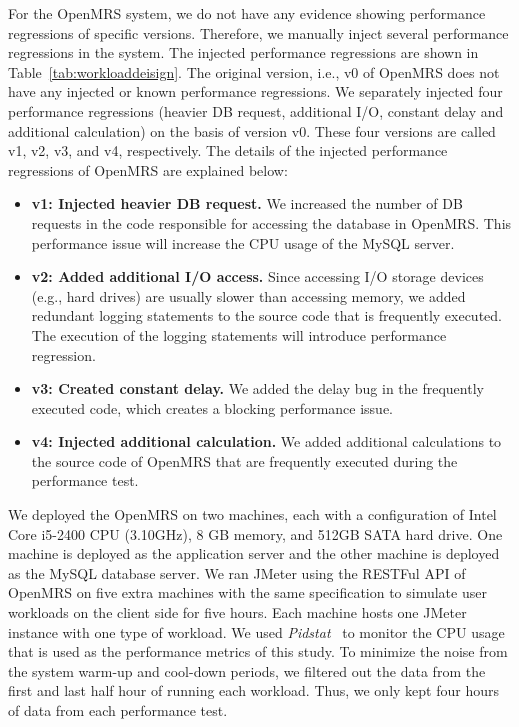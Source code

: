 For the OpenMRS system, we do not have any evidence showing performance regressions of specific versions. Therefore, we manually inject several performance regressions in the system. The injected performance regressions are shown in Table~\ref{tab:workloaddeisign}. 
The original version, i.e., v0 of OpenMRS does not have any injected or known performance regressions. 
We separately injected four performance regressions (heavier DB request, additional I/O, constant delay and additional calculation) on the basis of version v0. These four versions are called v1, v2, v3, and v4, respectively. The details of the injected performance regressions of OpenMRS are explained below:
\begin{itemize}
    \item[$\bullet$] \textbf{v1: Injected heavier DB request.}  We increased the number of DB requests in the code responsible for accessing the database in OpenMRS. This performance issue will increase the CPU usage of the MySQL server.
    \item[$\bullet$] \textbf{v2: Added additional I/O access.} Since accessing I/O storage devices (e.g., hard drives) are usually slower than accessing memory, we added redundant logging statements to the source code that is frequently executed. The execution of the logging statements will introduce performance regression.
    \item[$\bullet$] \textbf{v3: Created constant delay.} We added the delay bug in the frequently executed code, which creates a blocking performance issue.
    \item[$\bullet$] \textbf{v4: Injected additional calculation.} We added additional calculations to the source code of OpenMRS that are frequently executed during the performance test.
\end{itemize}

We deployed the OpenMRS on two machines, each with a configuration of Intel Core i5-2400 CPU (3.10GHz), 8 GB memory, and 512GB SATA hard drive. One machine is deployed as the application server and the other machine is deployed as the MySQL database server. We ran JMeter using the RESTFul API of OpenMRS on five extra machines with the same specification to simulate user workloads on the client side for five hours. Each machine hosts one JMeter instance with one type of workload. We used \emph{Pidstat}~\citep{pidstat} to monitor the CPU usage that is used as the performance metrics of this study.
To minimize the noise from the system warm-up and cool-down periods, we filtered out the data from the first and last half hour of running each workload. Thus, we only kept four hours of data from each performance test.

